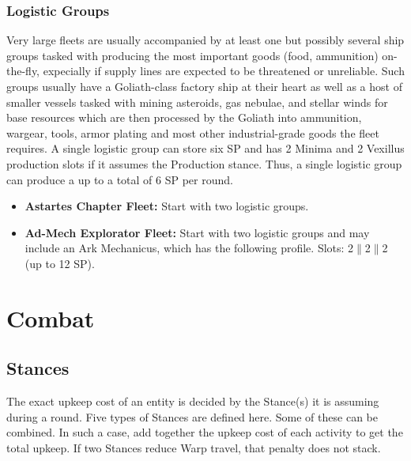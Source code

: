 \subsection{Logistic Groups}
Very large fleets are usually accompanied by at least one but possibly several ship groups tasked with producing the most important goods (food, ammunition) on-the-fly, expecially if supply lines are expected to be threatened or unreliable. 
Such groups usually have a Goliath-class factory ship at their heart as well as a host of smaller vessels tasked with mining asteroids, gas nebulae, and stellar winds for base resources which are then processed by the Goliath into ammunition, wargear, tools, armor plating and most other industrial-grade goods the fleet requires. \newline
A single logistic group can store six SP and has 2 Minima and 2 Vexillus production slots if it assumes the Production stance. Thus, a single logistic group can produce a up to a total of 6 SP per round.
\begin{itemize}
	\item \textbf{Astartes Chapter Fleet:} Start with two logistic groups.
	\item \textbf{Ad-Mech Explorator Fleet:} Start with two logistic groups and may include an Ark Mechanicus, which has the following profile. Slots: 2$\|$2$\|$2 (up to 12 SP).
\end{itemize}

\chapter{Combat}
\section{Stances} \label{stances}
The exact upkeep cost of an entity is decided by the Stance(s) it is assuming during a round. Five types of Stances are defined here. Some of these can be combined. In such a case, add together the upkeep cost of each activity to get the total upkeep. If two Stances reduce Warp travel, that penalty does not stack.

